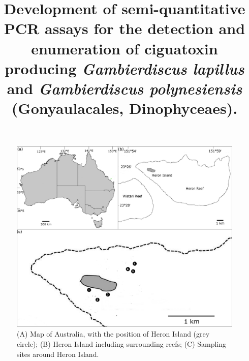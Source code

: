 \documentclass[12pt]{article}
\title{Development of semi-quantitative PCR assays for the detection and enumeration of ciguatoxin producing \emph{Gambierdiscus lapillus} and \emph{Gambierdiscus polynesiensis} (Gonyaulacales, Dinophyceaes).}
\author{}
\date{}
\begin{document}
\maketitle


\begin{figure} 
\includegraphics[scale=1.5]{Hero_qpcr-figs/Fig1_Heron_sample-map_May18.png} 
\caption{(A) Map of Australia, with the position of Heron Island (grey circle); (B) Heron Island including surrounding reefs; (C) Sampling sites around Heron Island.} 
\label{fig:samplesites}
\end{figure} 
\FloatBarrier
\end{document}

